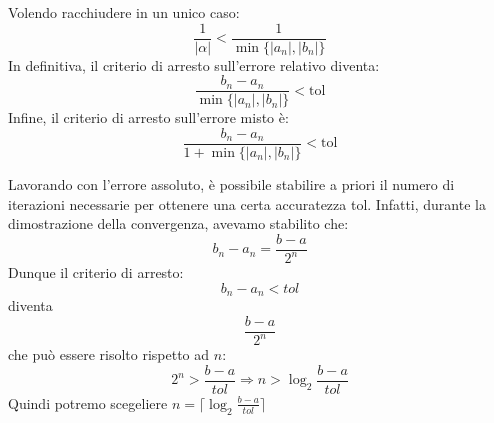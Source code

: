 \documentclass[12pt]{report}
\begin{document}
Volendo racchiudere in un unico caso:
\[
\frac{1}{|\alpha|} < \frac{1}{\min\{|a_n|, |b_n|\}}
\]
In definitiva, il criterio di arresto sull'errore relativo diventa:
\[
\frac{b_n - a_n}{\min\{|a_n|, |b_n|\}} < \text{tol}
\]
Infine, il criterio di arresto sull'errore misto è:
\[
\frac{b_n - a_n}{1 + \min\{|a_n|, |b_n|\}} < \text{tol}
\]
\begin{note}{}{}
	Lavorando con l'errore assoluto, è possibile stabilire a priori il numero di iterazioni necessarie per ottenere una certa accuratezza tol. Infatti, durante la dimostrazione della convergenza, avevamo stabilito che:
	\[
	b_n - a_n = \frac{b-a}{2^n}
	\]
	Dunque il criterio di arresto:
	\[
	b_n - a_n < tol
	\]
	diventa
	\[
	\frac{b-a}{2^n}
	\]
	che può essere risolto rispetto ad $n$:
	\[
	2^n > \frac{b-a}{tol} \Rightarrow n > \log_2\frac{b-a}{tol}
	\]
	Quindi potremo scegeliere $n = \Big\lceil \log_2\frac{b-a}{tol} \Big\rceil$
\end{note}
\end{document}
